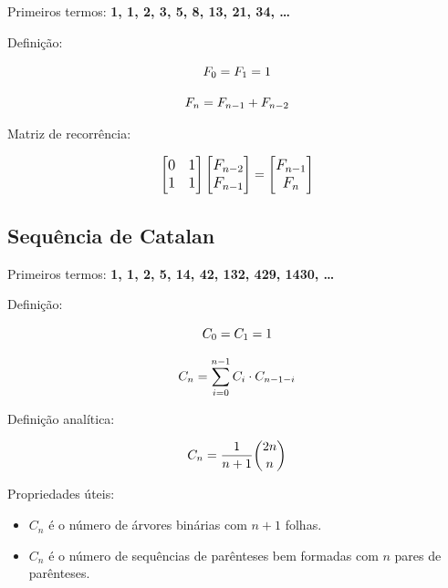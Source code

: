 Primeiros termos: \textbf{1, 1, 2, 3, 5, 8, 13, 21, 34, \ldots}

Definição:

\begin{equation*}
\large
F_0 = F_1 = 1
\end{equation*}

\begin{equation*}
\large
F_n = F_{n-1} + F_{n-2}
\end{equation*}

Matriz de recorrência:

\begin{equation*}
\large
\begin{bmatrix}
    0 & 1 \\
    1 & 1
\end{bmatrix}
\begin{bmatrix}
    F_{n-2} \\
    F_{n-1}
\end{bmatrix}
=
\begin{bmatrix}
    F_{n-1} \\
    F_n
\end{bmatrix}
\end{equation*}

\subsection{Sequência de Catalan}

Primeiros termos: \textbf{1, 1, 2, 5, 14, 42, 132, 429, 1430, \ldots}

Definição:

\begin{equation*}
\large
C_0 = C_1 = 1
\end{equation*}

\begin{equation*}
\large
C_n = \sum_{i=0}^{n-1} C_i \cdot C_{n-1-i}
\end{equation*}

Definição analítica:

\begin{equation*}
\large
C_n = \frac{1}{n+1} \binom{2n}{n}
\end{equation*}

Propriedades úteis:

\begin{itemize}
  \item $C_n$ é o número de árvores binárias com $n+1$ folhas.
  \item $C_n$ é o número de sequências de parênteses bem formadas com $n$ pares de parênteses.
\end{itemize}

